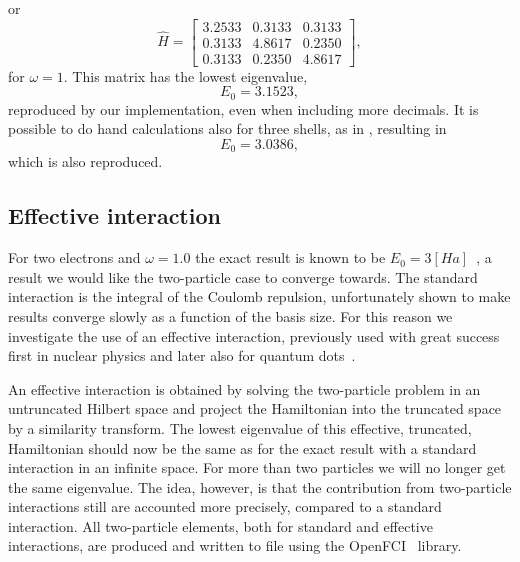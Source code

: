 or 
\begin{equation}
\hat{H}
=
\begin{bmatrix}
3.2533 & 0.3133 & 0.3133 \\
0.3133 & 4.8617 & 0.2350 \\
0.3133 & 0.2350 & 4.8617 
\end{bmatrix},
\end{equation}
for $\omega=1$.
This matrix has the lowest eigenvalue,
\begin{equation}
E_0 = 3.1523,
\end{equation}
reproduced by our implementation, even when including more decimals. 
It is possible to do hand calculations also for three shells, as in \cite{marte}, resulting in 
\begin{equation}
E_0 = 3.0386,
\end{equation}
which is also reproduced.



\subsection{Effective interaction}
\label{ssec:results:veff}
For two electrons and $\omega = 1.0$ the exact result is known to be $E_0 = 3[Ha]$~\cite{mtaut}, a result we would like the two-particle case to converge towards.
The standard interaction is the integral of the Coulomb repulsion, unfortunately shown to make results converge slowly as a function of the basis size. 
For this reason we investigate the use of an effective interaction, previously used with great success first in nuclear physics and later also for quantum dots~\cite{PhysRevB.84.115302}.

An effective interaction is obtained by solving the two-particle problem in an untruncated Hilbert space and project the Hamiltonian into the truncated space by a similarity transform.
The lowest eigenvalue of this effective, truncated, Hamiltonian should now be the same as for the exact result with a standard interaction in an infinite space.
For more than two particles we will no longer get the same eigenvalue.
The idea, however, is that the contribution from two-particle interactions still are accounted more precisely, compared to a standard interaction.
All two-particle elements, both for standard and effective interactions, are produced and written to file using the OpenFCI~\cite{openfci} library.

